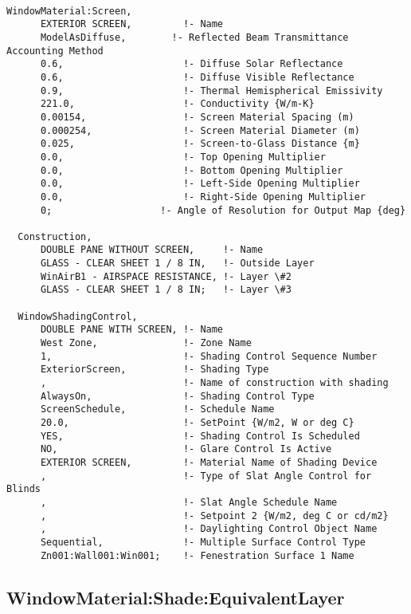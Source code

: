 \begin{lstlisting}

WindowMaterial:Screen,
      EXTERIOR SCREEN,         !- Name
      ModelAsDiffuse,        !- Reflected Beam Transmittance Accounting Method
      0.6,                     !- Diffuse Solar Reflectance
      0.6,                     !- Diffuse Visible Reflectance
      0.9,                     !- Thermal Hemispherical Emissivity
      221.0,                   !- Conductivity {W/m-K}
      0.00154,                 !- Screen Material Spacing (m)
      0.000254,                !- Screen Material Diameter (m)
      0.025,                   !- Screen-to-Glass Distance {m}
      0.0,                     !- Top Opening Multiplier
      0.0,                     !- Bottom Opening Multiplier
      0.0,                     !- Left-Side Opening Multiplier
      0.0,                     !- Right-Side Opening Multiplier
      0;                   !- Angle of Resolution for Output Map {deg}

  Construction,
      DOUBLE PANE WITHOUT SCREEN,     !- Name
      GLASS - CLEAR SHEET 1 / 8 IN,   !- Outside Layer
      WinAirB1 - AIRSPACE RESISTANCE, !- Layer \#2
      GLASS - CLEAR SHEET 1 / 8 IN;   !- Layer \#3

  WindowShadingControl,
      DOUBLE PANE WITH SCREEN, !- Name
      West Zone,               !- Zone Name
      1,                       !- Shading Control Sequence Number
      ExteriorScreen,          !- Shading Type
      ,                        !- Name of construction with shading
      AlwaysOn,                !- Shading Control Type
      ScreenSchedule,          !- Schedule Name
      20.0,                    !- SetPoint {W/m2, W or deg C}
      YES,                     !- Shading Control Is Scheduled
      NO,                      !- Glare Control Is Active
      EXTERIOR SCREEN,         !- Material Name of Shading Device
      ,                        !- Type of Slat Angle Control for Blinds
      ,                        !- Slat Angle Schedule Name
      ,                        !- Setpoint 2 {W/m2, deg C or cd/m2}
      ,                        !- Daylighting Control Object Name
      Sequential,              !- Multiple Surface Control Type
      Zn001:Wall001:Win001;    !- Fenestration Surface 1 Name
\end{lstlisting}

\subsection{WindowMaterial:Shade:EquivalentLayer}\label{windowmaterialshadeequivalentlayer}

